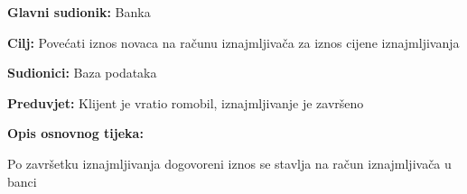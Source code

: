 							\noindent {}
						\begin{packed_item}
							
							\item \textbf{Glavni sudionik: }Banka
							\item  \textbf{Cilj: }Povećati iznos novaca na računu iznajmljivača za iznos cijene iznajmljivanja
							\item  \textbf{Sudionici: }Baza podataka
							\item  \textbf{Preduvjet: }Klijent je vratio romobil, iznajmljivanje je završeno
							\item  \textbf{Opis osnovnog tijeka:}
							
							\item[] \begin{packed_enum}
								
								\item Po završetku iznajmljivanja dogovoreni iznos se stavlja na račun iznajmljivača u banci
								
							\end{packed_enum}
						\end{packed_item}
						
